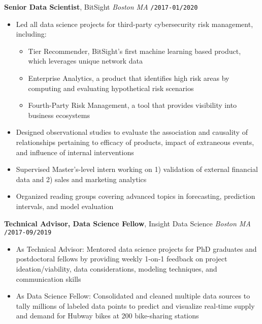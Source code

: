 \documentclass[10pt,english]{report}
\begin{document}
\vspace{1mm}

\textbf{Senior Data Scientist}, BitSight \hfill \textit{Boston MA} \texttt{/2017-01/2020}
\begin{itemize}
		\item Led all data science projects for third-party cybersecurity risk management, including:
		\begin{itemize}
				\item Tier Recommender, BitSight's first machine learning based product, which leverages unique network data
				\item Enterprise Analytics, a product that identifies high risk areas by computing and evaluating hypothetical risk scenarios
				\item Fourth-Party Risk Management, a tool that provides visibility into business ecosystems
		\end{itemize}
    \item Designed observational studies to evaluate the association and causality of relationships pertaining to efficacy of products, impact of extraneous events, and influence of internal interventions
		\item Supervised Master's-level intern working on 1) validation of external financial data and 2) sales and marketing analytics
		\item Organized reading groups covering advanced topics in forecasting, prediction intervals, and model evaluation
\end{itemize}

\vspace{1mm}

\textbf{Technical Advisor, Data Science Fellow}, Insight Data Science \hfill \textit{Boston MA} \texttt{/2017-09/2019}
\begin{itemize}
    \item As Technical Advisor: Mentored data science projects for PhD graduates and postdoctoral fellows by providing weekly 1-on-1 feedback on project ideation/viability, data considerations, modeling techniques, and communication skills
    \item As Data Science Fellow: Consolidated and cleaned multiple data sources to tally millions of labeled data points to predict and visualize real-time supply and demand for Hubway bikes at 200 bike-sharing stations
\end{itemize}
\end{document}
